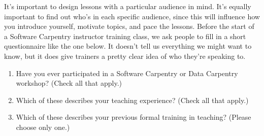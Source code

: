 It's important to design lessons with a particular audience in mind.
It's equally important to find out who's in each specific audience,
since this will influence how you introduce yourself, motivate topics,
and pace the lessons.  Before the start of a Software Carpentry
instructor training class, we ask people to fill in a short
questionnaire like the one below.  It doesn't tell us everything we
might want to know, but it does give trainers a pretty clear idea of
who they're speaking to.

\begin{enumerate}

\item
  Have you ever participated in a Software Carpentry or Data Carpentry
  workshop? (Check all that apply.)


\item
  Which of these describes your teaching experience?  (Check all that
  apply.)


\item
  Which of these describes your previous formal training in teaching?
  (Please choose only one.)



\end{enumerate}
